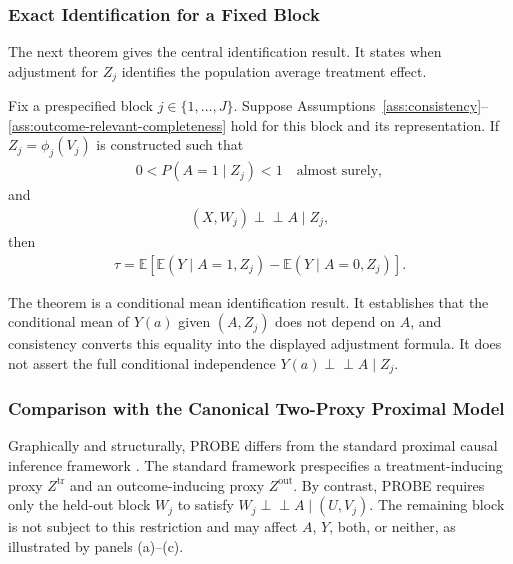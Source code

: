 \subsubsection{Exact Identification for a Fixed Block}
\label{sec:exact-proxy-identification}

The next theorem gives the central identification result. It states when adjustment for $Z_j$ identifies the population average treatment effect.

\begin{theorem} \label{thm:exact-proxy-identification}
\normalfont
Fix a prespecified block $j\in\{1,\ldots,J\}$. Suppose Assumptions~\ref{ass:consistency}--\ref{ass:outcome-relevant-completeness} hold for this block and its representation. If $Z_j=\phi_j(V_j)$ is constructed such that
	\begin{align}
		0<P(A=1\mid Z_j)<1
		\quad\text{almost surely},
		\label{eq:representation-overlap}
	\end{align}
and
	\begin{align}
		(X,W_j)\perp\!\!\!\perp A\mid Z_j, \label{eq:exact-proxy-balance}
	\end{align}
	then
	\begin{align}
		\tau = \mathbb E\!\left[ \mathbb E(Y\mid A=1,Z_j) - \mathbb E(Y\mid A=0,Z_j) \right]. \label{eq:exact-identification}
	\end{align}
\end{theorem}

The theorem is a conditional mean identification result. It establishes that the conditional mean of $Y(a)$ given $(A,Z_j)$ does not depend on $A$, and consistency converts this equality into the displayed adjustment formula. It does not assert the full conditional independence $Y(a)\perp\!\!\!\perp A\mid Z_j$.

\subsubsection{Comparison with the Canonical Two-Proxy Proximal Model}

Graphically and structurally, PROBE differs from the standard proximal causal inference framework \citep{miao2018proxy,tchetgen2024ProximalCausalInference}. The standard framework prespecifies a treatment-inducing proxy $Z^{\mathrm{tr}}$ and an outcome-inducing proxy $Z^{\mathrm{out}}$. By contrast, PROBE requires only the held-out block $W_j$ to satisfy $W_j\perp\!\!\!\perp A\mid(U,V_j)$. The remaining block is not subject to this restriction and may affect $A$, $Y$, both, or neither, as illustrated by panels (a)--(c).

